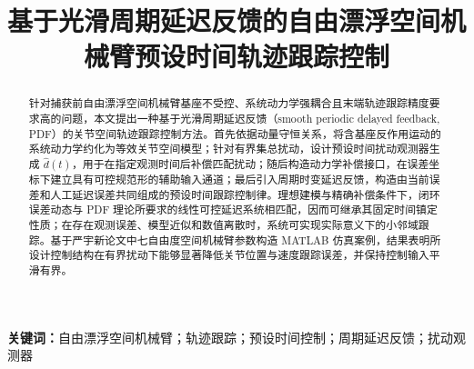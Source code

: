 \documentclass[UTF8,a4paper,12pt,fontset=none]{ctexart}
\title{基于光滑周期延迟反馈的自由漂浮空间机械臂预设时间轨迹跟踪控制}
\author{}
\date{}
\begin{document}
\maketitle

\begin{abstract}
针对捕获前自由漂浮空间机械臂基座不受控、系统动力学强耦合且末端轨迹跟踪精度要求高的问题，本文提出一种基于光滑周期延迟反馈（smooth periodic delayed feedback, PDF）的关节空间轨迹跟踪控制方法。首先依据动量守恒关系，将含基座反作用运动的系统动力学约化为等效关节空间模型；针对有界集总扰动，设计预设时间扰动观测器生成 \(\hat d(t)\)，用于在指定观测时间后补偿匹配扰动；随后构造动力学补偿接口，在误差坐标下建立具有可控规范形的辅助输入通道；最后引入周期时变延迟反馈，构造由当前误差和人工延迟误差共同组成的预设时间跟踪控制律。理想建模与精确补偿条件下，闭环误差动态与 PDF 理论所要求的线性可控延迟系统相匹配，因而可继承其固定时间镇定性质；在存在观测误差、模型近似和数值离散时，系统可实现实际意义下的小邻域跟踪。基于严宇新论文中七自由度空间机械臂参数构造 MATLAB 仿真案例，结果表明所设计控制结构在有界扰动下能够显著降低关节位置与速度跟踪误差，并保持控制输入平滑有界。
\end{abstract}

\noindent\textbf{关键词：}自由漂浮空间机械臂；轨迹跟踪；预设时间控制；周期延迟反馈；扰动观测器









\printbibliography[title={参考文献}]
\end{document}
